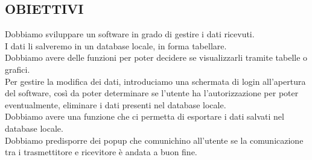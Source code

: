 \documentclass{report}
\begin{document}
\subsection{OBIETTIVI}
Dobbiamo sviluppare un software in grado di gestire i dati ricevuti.\\
I dati li salveremo in un database locale, in forma tabellare.\\
Dobbiamo avere delle funzioni per poter decidere se visualizzarli tramite tabelle o grafici.\\
Per gestire la modifica dei dati, introduciamo una schermata di login all'apertura del software, così da poter determinare se l'utente ha l'autorizzazione per poter eventualmente, eliminare i dati presenti nel database locale.\\
Dobbiamo avere una funzione che ci permetta di esportare i dati salvati nel database locale.\\
Dobbiamo predisporre dei popup che comunichino all'utente se la comunicazione tra i trasmettitore e ricevitore è andata a buon fine.\\ 
\end{document}

